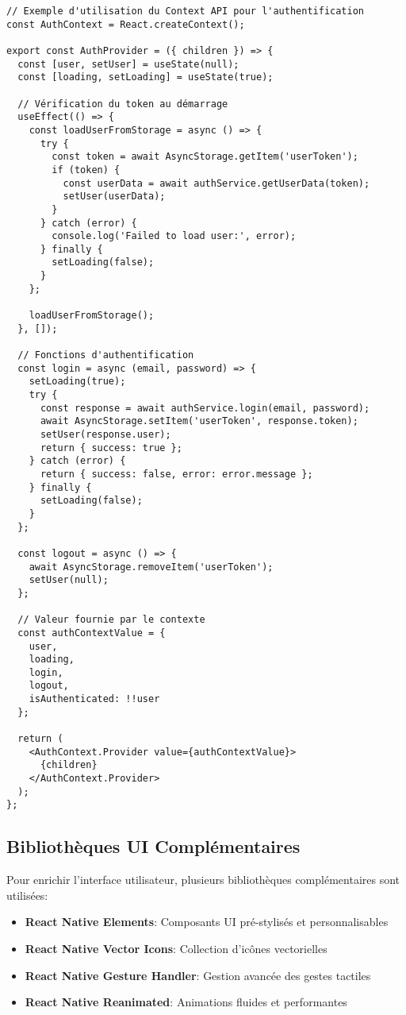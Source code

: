 \begin{verbatim}
// Exemple d'utilisation du Context API pour l'authentification
const AuthContext = React.createContext();

export const AuthProvider = ({ children }) => {
  const [user, setUser] = useState(null);
  const [loading, setLoading] = useState(true);
  
  // Vérification du token au démarrage
  useEffect(() => {
    const loadUserFromStorage = async () => {
      try {
        const token = await AsyncStorage.getItem('userToken');
        if (token) {
          const userData = await authService.getUserData(token);
          setUser(userData);
        }
      } catch (error) {
        console.log('Failed to load user:', error);
      } finally {
        setLoading(false);
      }
    };
    
    loadUserFromStorage();
  }, []);
  
  // Fonctions d'authentification
  const login = async (email, password) => {
    setLoading(true);
    try {
      const response = await authService.login(email, password);
      await AsyncStorage.setItem('userToken', response.token);
      setUser(response.user);
      return { success: true };
    } catch (error) {
      return { success: false, error: error.message };
    } finally {
      setLoading(false);
    }
  };
  
  const logout = async () => {
    await AsyncStorage.removeItem('userToken');
    setUser(null);
  };
  
  // Valeur fournie par le contexte
  const authContextValue = {
    user,
    loading,
    login,
    logout,
    isAuthenticated: !!user
  };
  
  return (
    <AuthContext.Provider value={authContextValue}>
      {children}
    </AuthContext.Provider>
  );
};
\end{verbatim}

\subsection{Bibliothèques UI Complémentaires}

Pour enrichir l'interface utilisateur, plusieurs bibliothèques complémentaires sont utilisées:

\begin{itemize}
    \item \textbf{React Native Elements}: Composants UI pré-stylisés et personnalisables
    \item \textbf{React Native Vector Icons}: Collection d'icônes vectorielles
    \item \textbf{React Native Gesture Handler}: Gestion avancée des gestes tactiles
    \item \textbf{React Native Reanimated}: Animations fluides et performantes
\end{itemize}

